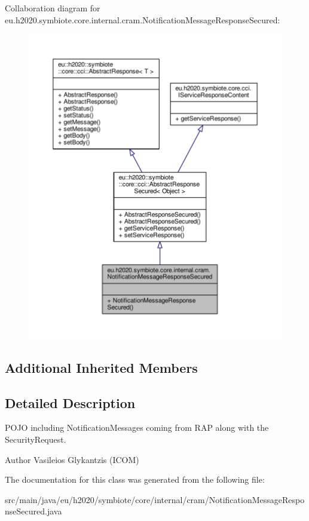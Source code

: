 Collaboration diagram for eu.\+h2020.\+symbiote.\+core.\+internal.\+cram.\+Notification\+Message\+Response\+Secured\+:
\nopagebreak
\begin{figure}[H]
\begin{center}
\leavevmode
\includegraphics[width=350pt]{classeu_1_1h2020_1_1symbiote_1_1core_1_1internal_1_1cram_1_1NotificationMessageResponseSecured__coll__graph}
\end{center}
\end{figure}
\subsection*{Additional Inherited Members}


\subsection{Detailed Description}
P\+O\+JO including Notification\+Messages coming from R\+AP along with the Security\+Request. \begin{DoxyAuthor}{Author}
Vasileios Glykantzis (I\+C\+OM) 
\end{DoxyAuthor}


The documentation for this class was generated from the following file\+:\begin{DoxyCompactItemize}
\item 
src/main/java/eu/h2020/symbiote/core/internal/cram/Notification\+Message\+Response\+Secured.\+java\end{DoxyCompactItemize}
